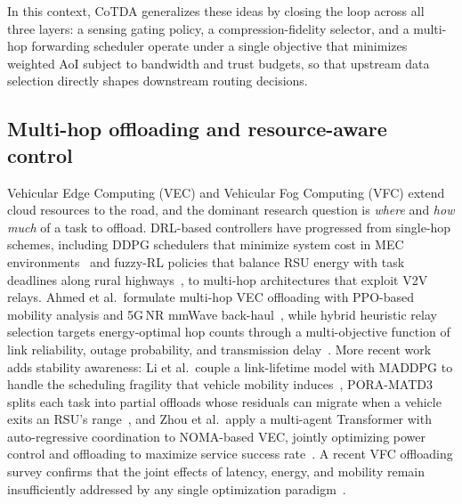 \documentclass[final,3p,times,review,sort&compress]{elsarticle}
\begin{document}
In this context, CoTDA generalizes these ideas by closing the loop across all three layers: a sensing gating policy, a compression-fidelity selector, and a multi-hop forwarding scheduler operate under a single objective that minimizes weighted AoI subject to bandwidth and trust budgets, so that upstream data selection directly shapes downstream routing decisions.

\subsection{Multi-hop offloading and resource-aware control}
Vehicular Edge Computing (VEC) and Vehicular Fog Computing (VFC) extend cloud resources to the road, and the dominant research question is \emph{where} and \emph{how much} of a task to offload.  DRL-based controllers have progressed from single-hop schemes, including DDPG schedulers that minimize system cost in MEC environments~\cite{ZHAO2023103193} and fuzzy-RL policies that balance RSU energy with task deadlines along rural highways~\cite{VEMIREDDY2021108463}, to multi-hop architectures that exploit V2V relays.  Ahmed et al.\ formulate multi-hop VEC offloading with PPO-based mobility analysis and 5G\,NR mmWave back-haul~\cite{AHMED2024101854}, while hybrid heuristic relay selection targets energy-optimal hop counts through a multi-objective function of link reliability, outage probability, and transmission delay~\cite{KIRAN2023103058}.  More recent work adds stability awareness: Li et al.\ couple a link-lifetime model with MADDPG to handle the scheduling fragility that vehicle mobility induces~\cite{LI2026103079}, PORA-MATD3 splits each task into partial offloads whose residuals can migrate when a vehicle exits an RSU's range~\cite{XUE2025108081}, and Zhou et al.\ apply a multi-agent Transformer with auto-regressive coordination to NOMA-based VEC, jointly optimizing power control and offloading to maximize service success rate~\cite{ZHOU2026104222}.  A recent VFC offloading survey confirms that the joint effects of latency, energy, and mobility remain insufficiently addressed by any single optimization paradigm~\cite{SNEHA2026110847}.
\end{document}
